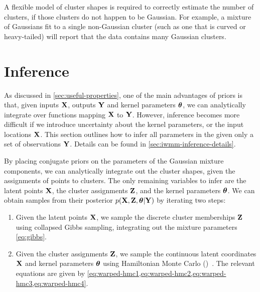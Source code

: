 A flexible model of cluster shapes is required to correctly estimate the number of clusters, if those clusters do not happen to be Gaussian.
For example, a mixture of Gaussians fit to a single non-Gaussian cluster (such as one that is curved or heavy-tailed) will report that the data contains many Gaussian clusters.





\section{Inference}
\label{sec:iwmm-inference}

As discussed in \cref{sec:useful-properties}, one of the main advantages of \gp{} priors is that, given inputs $\mathbf{X}$, outputs $\mathbf{Y}$ and kernel parameters ${\boldsymbol{\theta}}$, we can analytically integrate over functions mapping $\mathbf{X}$ to $\mathbf{Y}$.
However, inference becomes more difficult if we introduce uncertainty about the kernel parameters, or the input locations $\mathbf{X}$.
This section outlines how to infer all parameters in the \iwmm{} given only a set of observations $\mathbf{Y}$.
Details can be found in \cref{sec:iwmm-inference-details}.

By placing conjugate priors on the parameters of the Gaussian mixture components, we can analytically integrate out the cluster shapes, given the assignments of points to clusters.
The only remaining variables to infer are the latent points $\mathbf{X}$, the cluster assignments $\mathbf{Z}$, and the kernel parameters ${\boldsymbol{\theta}}$.
%
%
We can obtain samples from their posterior 
$p(\mathbf{X},\mathbf{Z}, {\boldsymbol{\theta}} | \mathbf{Y})$ 
by iterating two steps:
\begin{enumerate}
\item
Given the latent points $\mathbf{X}$, we sample the discrete cluster memberships $\mathbf{Z}$ using collapsed Gibbs sampling, integrating out the mixture parameters \eqref{eq:gibbs}.
\item 
Given the cluster assignments $\mathbf{Z}$, we sample the continuous latent coordinates $\mathbf{X}$ and kernel parameters ${\boldsymbol{\theta}}$ using Hamiltonian Monte Carlo (\HMC{})~\citep[chapter 30]{mackay2003information}.
The relevant equations are given by \cref{eq:warped-hmc1,eq:warped-hmc2,eq:warped-hmc3,eq:warped-hmc4}.
\end{enumerate}


